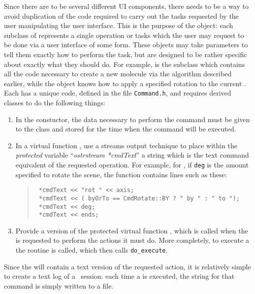 Since there are to be several different UI components, there needs to be a way to avoid duplication of the code required to carry out the tasks requested by the user manipulating the user interface.  This is the purpose of the  object: each subclass of  represents a single operation or tasks which the user may request to be done via a user interface of some form.  These  objects may take parameters to tell them exactly how to perform the task, but are designed to be rather specific about exactly what they should do.  For example,  is the  subclass which contains all the code necessary to create a new molecule via the algorithm described earlier, while the  object knows how to apply a specified rotation to the current .  Each  has a unique code, defined in the file {\tt Command.h}, and requires derived classes to do the following things:
\begin{enumerate}
  \item In the constuctor, the data necessary to perform the command must
be given to the class and stored for the time when the command will be
executed.
  \item In a virtual function , use a streams output technique to place within the {\em protected} variable ``{\em ostrstream *cmdText}'' a string which is the text command equivalent of the requested operation.  For example, for , if {\tt deg} is the amount specified to rotate the scene, the function contains lines such as these:
    \begin{quote} {\tt
        *cmdText << "rot " << axis; \\
        \ *cmdText << ( byOrTo == CmdRotate::BY ? " by " : " to "); \\
        \ *cmdText << deg; \\
        \ *cmdText << ends;
    } \end{quote}
  \item Provide a version of the protected virtual function , which is called when the  is requested to perform the actions it must do.  More completely, to execute a  the routine  is called, which then calls {\tt do\_execute}.
\end{enumerate}
Since the  will contain a text version of the requested action, it is relatively simple to create a text log of a \VMD\ session: each time a  is executed, the string for that command is simply written to a file.


